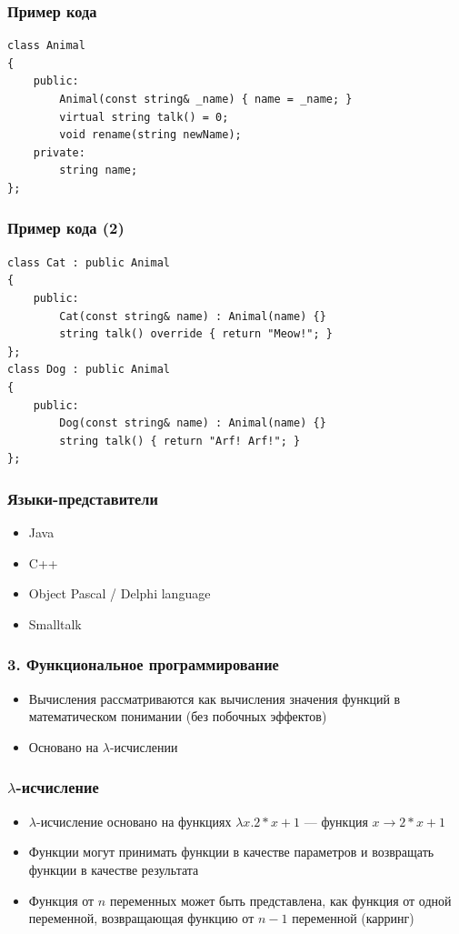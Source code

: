 \documentclass[xetex,mathserif,serif]{beamer}
\begin{document}
	\begin{frame}[fragile]
		\frametitle{Пример кода}
		\begin{footnotesize}
			\begin{verbatim}
class Animal
{
    public:
        Animal(const string& _name) { name = _name; }
        virtual string talk() = 0;
        void rename(string newName);
    private:
        string name;
};
			\end{verbatim}
		\end{footnotesize}
	\end{frame}

	\begin{frame}[fragile]
		\frametitle{Пример кода (2)}
		\begin{footnotesize}
			\begin{verbatim}
class Cat : public Animal
{
    public:
        Cat(const string& name) : Animal(name) {}
        string talk() override { return "Meow!"; }
};
class Dog : public Animal
{
    public:
        Dog(const string& name) : Animal(name) {}
        string talk() { return "Arf! Arf!"; }
};
			\end{verbatim}
		\end{footnotesize}
	\end{frame}

	\begin{frame}
		\frametitle{Языки-представители}
		\begin{itemize}
			\item Java
			\item C++
			\item Object Pascal / Delphi language
			\item Smalltalk
		\end{itemize}
	\end{frame}

	\begin{frame}
		\frametitle{3. Функциональное программирование}
		\begin{itemize}
			\item Вычисления рассматриваются как вычисления значения функций в математическом понимании (без побочных эффектов)
			\item Основано на $\lambda$-исчислении
		\end{itemize}
	\end{frame}

	\begin{frame}
		\frametitle{$\lambda$-исчисление}
		\begin{itemize}
			\item $\lambda$-исчисление основано на функциях
			$\lambda x.2 * x + 1$ --- функция $x \rightarrow 2 * x + 1$
			\item Функции могут принимать функции в качестве параметров и возвращать функции в качестве результата
			\item Функция от $n$ переменных может быть представлена, как функция от одной переменной, возвращающая функцию от $n-1$ переменной (карринг)
		\end{itemize}
	\end{frame}
\end{document}

